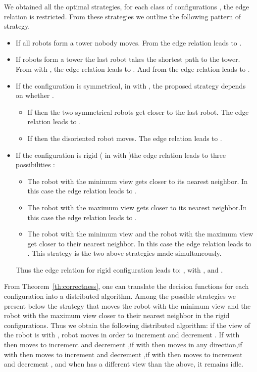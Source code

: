 \documentclass[envcountsame]{llncs} \usepackage[english]{babel}
\begin{document}
We obtained all the optimal strategies, for each class of configurations 
, the edge relation is restricted.
From these strategies we outline the following pattern of strategy.
\begin{itemize}[parsep=0cm,itemsep=0cm,topsep=0cm] 
	\item If all robots form a tower nobody moves.
From  the edge relation leads to .
	\item If  robots form a tower the last robot takes the shortest path to the tower.
From with , the edge relation leads to 
.
And from  the edge relation leads to 
.
	\item If the configuration is symmetrical, in with , 
the proposed strategy depends on whether . 
	\begin{itemize}[parsep=0cm,itemsep=0cm,topsep=0cm] 	
		\item  If  then the two symmetrical robots get closer to the last robot.  The edge relation leads to .
		\item  If  then the disoriented robot moves. The edge relation leads to .
	\end{itemize}
	\item If the configuration is rigid ( in with )the edge relation leads to three possibilities : 
	\begin{itemize}[parsep=0cm,itemsep=0cm,topsep=0cm] 
		\item The robot with the minimum view gets closer to its nearest neighbor. In this case the edge relation leads to .
		\item The robot with the maximum view gets closer to its nearest neighbor.In this case the edge relation leads to .
		\item The robot with the minimum view and the robot with the maximum view get
		closer to their nearest neighbor.
	In this case the edge relation leads to  .
		This strategy is the two above strategies made simultaneously.\end{itemize}
	Thus the edge relation for rigid configuration leads to: , 
	with ,  and .
\end{itemize}

From Theorem~\ref{th:correctness}, one can translate the decision functions for each configuration
into a distributed algorithm.
Among the possible strategies we present below the strategy that moves the robot with the minimum view and
the robot with the maximum view closer to their nearest neighbor in the rigid configurations.
Thus we obtain the following distributed algorithm: if the view of the robot  is 
 with ,  robot moves in order to increment  and decrement . If   with  then  moves to increment  and decrement ,if   with  then  moves in any direction,if  with  then  moves to increment  and decrement ,if  with  then  moves to increment  and decrement , and when  has a different view than the above, it remains idle.
  
\end{document}
